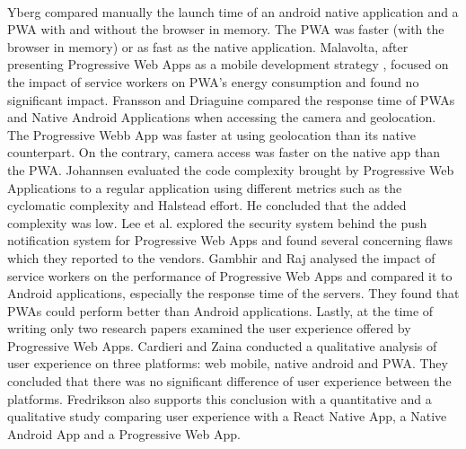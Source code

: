 \documentclass{kththesis}
\begin{document}
\paragraph{}
Yberg \cite{YbergViktor2018NPaU} compared manually the launch time of an android native application and a PWA with and without the browser in memory. The PWA was faster (with the browser in memory) or as fast as the native application. \newline
Malavolta, after presenting Progressive Web Apps as a mobile development strategy \cite{malavolta2016beyond}, focused on the impact of service workers on PWA's energy consumption and found no significant impact\cite{SW_and_energy}. \newline
Fransson and Driaguine \cite{PWAbc_responsetime} compared the response time of PWAs and Native Android Applications when accessing the camera and geolocation. The Progressive Webb App was faster at using geolocation than its native counterpart. On the contrary, camera access was faster on the native app than the PWA. \newline
Johannsen \cite{JohannsenFabian2018PWAa} evaluated the code complexity brought by Progressive Web Applications to a regular application using different metrics such as the cyclomatic complexity and Halstead effort. He concluded that the added complexity was low. \newline
Lee et al. \cite{Pride_Prejudice} explored the security system behind the push notification system for Progressive Web Apps and found several concerning flaws which they reported to the vendors. \newline
Gambhir and Raj \cite{gambhir2018analysis} analysed the impact of service workers on the performance of Progressive Web Apps and compared it to Android applications, especially the response time of the servers. They found that PWAs could perform better than Android applications. \newline
Lastly, at the time of writing only two research papers examined the user experience offered by Progressive Web Apps. Cardieri and Zaina \cite{PWA_UX_comparison_study} conducted a qualitative analysis of user experience on three platforms: web mobile, native android and PWA. They concluded that there was no significant difference of user experience between the platforms. Fredrikson \cite{emulating_native_w_crossplatform} also supports this conclusion with a quantitative and a qualitative study comparing user experience with a React Native App, a Native Android App and a Progressive Web App. 
\end{document}
